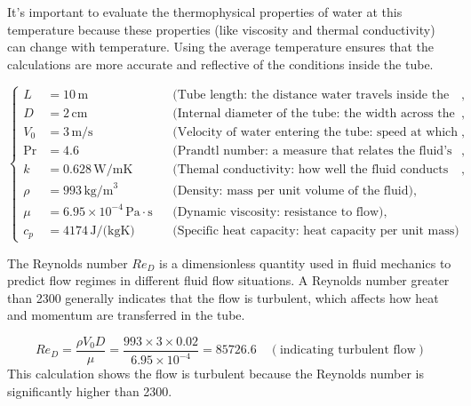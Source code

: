 \documentclass{article}
\numberwithin{equation}{section}
\begin{document}
It's important to evaluate the thermophysical properties of water at this temperature because these properties (like viscosity and thermal conductivity) can change with temperature. Using the average temperature ensures that the calculations are more accurate and reflective of the conditions inside the tube.

\begin{equation}
\left\{
\begin{aligned}
    L &= 10\, \text{m} && \text{(Tube length: the distance water travels inside the tube)}, \\
    D &= 2\, \text{cm} && \text{(Internal diameter of the tube: the width across the tube)}, \\
    V_0 &= 3\, \text{m/s} && \text{(Velocity of water entering the tube: speed at which water enters)}, \\
    \text{Pr} &= 4.6 && \text{(Prandtl number: a measure that relates the fluid's ability to transport momentum vs heat)}, \\
    k &= 0.628\, \text{W/mK} && \text{(Themal conductivity: how well the fluid conducts heat)}, \\
    \rho &= 993\, \text{kg/m}^3 && \text{(Density: mass per unit volume of the fluid)}, \\
    \mu &= 6.95 \times 10^{-4}\, \text{Pa}\cdot\text{s} && \text{(Dynamic viscosity: resistance to flow)}, \\
    c_p &= 4174\, \text{J/(kgK)} && \text{(Specific heat capacity: heat capacity per unit mass)}
\end{aligned}
\right.
\end{equation}


The Reynolds number \( Re_D \) is a dimensionless quantity used in fluid mechanics to predict flow regimes in different fluid flow situations. A Reynolds number greater than 2300 generally indicates that the flow is turbulent, which affects how heat and momentum are transferred in the tube.

\begin{equation}
    Re_D = \frac{\rho V_0 D}{\mu} = \frac{993 \times 3 \times 0.02}{6.95 \times 10^{-4}} = 85726.6 \quad (\text{indicating turbulent flow})
\end{equation}
This calculation shows the flow is turbulent because the Reynolds number is significantly higher than 2300.
\end{document}
